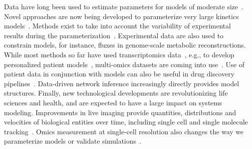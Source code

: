 \documentclass[]{draft-sbml-paper}
\begin{document}
Data have long been used to estimate parameters for models of moderate size~\citep{mendes1998non}. Novel approaches are now being developed to parameterize very large kinetics models~\citep{Villaverde2018}. Methods exist to take into account the variability of experimental results during the parameterization~\citep{liepe2010abc}. Experimental data are also used to constrain models, for instance, fluxes in genome-scale metabolic reconstructions. While most methods so far have used transcriptomics data~\citep{machado2014systematic}, e.g., to develop personalized patient models~\citep{uhlen2017pathology}, multi-omics datasets are coming into use~\citep{ebrahim2016multi}. Use of patient data in conjunction with models can also be useful in drug discovery pipelines~\citep{Jerby2012}. Data-driven network inference increasingly directly provides model structures. Finally, new technological developments are revolutionizing life sciences and health, and are expected to have a large impact on systems modeling. Improvements in live imaging provide quantities, distributions and velocities of biological entities over time, including single cell and single molecule tracking~\citep{lipkow2008model, griffin2011regulation}. Omics measurement at single-cell resolution also changes the way we parameterize models or validate simulations~\citep{Karr2012a, OBrien2013, Goelzer945, Yang2018}.
\end{document}
